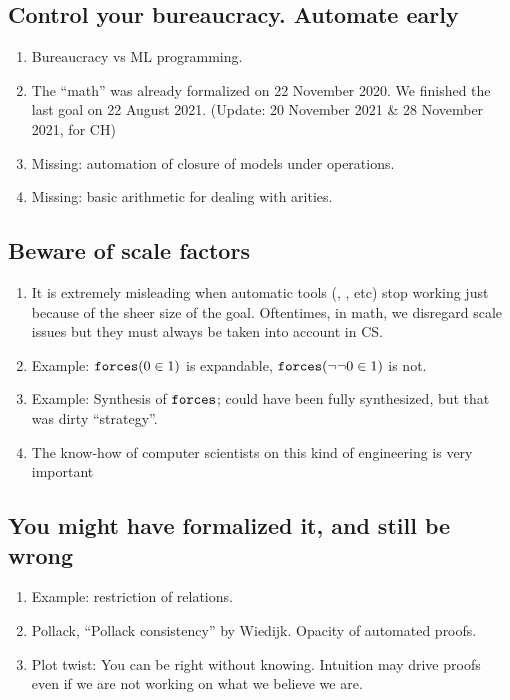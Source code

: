 \subsection{Control your bureaucracy. Automate early}
\begin{enumerate}
\item Bureaucracy vs ML programming.
\item The “math” was already formalized on 22 November 2020.
  We finished the last goal on 22 August 2021.
  (Update: 20 November 2021 \& 28 November 2021, for CH)
\item Missing: automation of closure of models under operations.
\item Missing: basic arithmetic for dealing with arities.
\end{enumerate}

\subsection{Beware of scale factors}
\begin{enumerate}
\item It is extremely misleading when automatic tools (, , etc)
  stop working just because of the sheer size of the goal. Oftentimes,
  in math, we disregard scale issues but they must always be taken
  into account in CS.
\item Example: $\mathop{\mathtt{forces}}(0\in 1)$ is expandable,
  $\mathop{\mathtt{forces}}(\neg\neg  0\in 1)$ is not.
\item Example: Synthesis of $\mathop{\mathtt{forces}}$; could have been fully synthesized,
  but that was dirty “strategy”.
\item The know-how of computer scientists on this kind of engineering is
  very important
\end{enumerate}

\subsection{You might have formalized it, and still be wrong}
\begin{enumerate}
\item Example: restriction of relations.
\item Pollack, “Pollack consistency” by Wiedijk. Opacity of automated
  proofs.
\item Plot twist: You can be right without knowing. Intuition may drive proofs
  even if we are not working on what we believe we are.
\end{enumerate}

